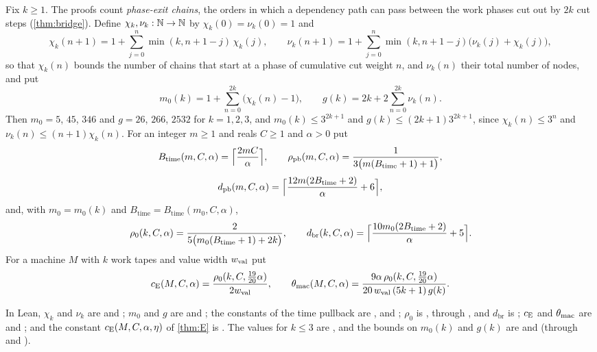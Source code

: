 Fix $k\ge1$. The proofs count \emph{phase-exit chains}, the orders in which a dependency path can pass between the work phases cut
out by $2k$ cut steps (\cref{thm:bridge}). Define $\chi_k,\nu_k:\mathbb{N}\to\mathbb{N}$ by $\chi_k(0)=\nu_k(0)=1$ and
\[
  \chi_k(n+1)=1+\sum_{j=0}^{n}\min(k,n+1-j)\,\chi_k(j),\qquad
  \nu_k(n+1)=1+\sum_{j=0}^{n}\min(k,n+1-j)\bigl(\nu_k(j)+\chi_k(j)\bigr),
\]
so that $\chi_k(n)$ bounds the number of chains that start at a phase of cumulative cut weight $n$, and $\nu_k(n)$ their total number
of nodes, and put
\[
  m_0(k)=1+\sum_{n=0}^{2k}\bigl(\chi_k(n)-1\bigr),\qquad g(k)=2k+2\sum_{n=0}^{2k}\nu_k(n).
\]
Then $m_0=5$, $45$, $346$ and $g=26$, $266$, $2532$ for $k=1,2,3$, and $m_0(k)\le3^{2k+1}$ and $g(k)\le(2k+1)3^{2k+1}$, since
$\chi_k(n)\le3^n$ and $\nu_k(n)\le(n+1)\chi_k(n)$. For an integer $m\ge1$ and reals $C\ge1$ and
$\alpha>0$ put
\[
  B_{\mathrm{time}}(m,C,\alpha)=\Bigl\lceil\frac{2mC}{\alpha}\Bigr\rceil,\qquad
  \rho_{\mathrm{pb}}(m,C,\alpha)=\frac{1}{3\bigl(m(B_{\mathrm{time}}+1)+1\bigr)},
\]
\[
  d_{\mathrm{pb}}(m,C,\alpha)=\Bigl\lceil\frac{12m(2B_{\mathrm{time}}+2)}{\alpha}+6\Bigr\rceil,
\]
and, with $m_0=m_0(k)$ and $B_{\mathrm{time}}=B_{\mathrm{time}}(m_0,C,\alpha)$,
\[
  \rho_0(k,C,\alpha)=\frac{2}{5\bigl(m_0(B_{\mathrm{time}}+1)+2k\bigr)},\qquad
  d_{\mathrm{br}}(k,C,\alpha)=\Bigl\lceil\frac{10m_0(2B_{\mathrm{time}}+2)}{\alpha}+5\Bigr\rceil.
\]
For a machine $M$ with $k$ work tapes and value width $w_{\mathrm{val}}$ put
\[
  c_{\mathrm{E}}(M,C,\alpha)=\frac{\rho_0(k,C,\tfrac{19}{20}\alpha)}{2w_{\mathrm{val}}},\qquad
  \theta_{\mathrm{mac}}(M,C,\alpha)=\frac{9\alpha\,\rho_0(k,C,\tfrac{19}{20}\alpha)}{20\,w_{\mathrm{val}}\,(5k+1)\,g(k)}.
\]
\begin{sloppypar}
In Lean, $\chi_k$ and $\nu_k$ are  and ; $m_0$ and $g$ are  and
; the constants of the time pullback are ,  and
; $\rho_0$ is , through , and $d_{\mathrm{br}}$ is
; $c_{\mathrm{E}}$ and $\theta_{\mathrm{mac}}$ are  and ; and the constant
$c_{\mathrm{E}}(M,C,\alpha,\eta)$ of \cref{thm:E} is . The values for $k\le3$ are ,
and the bounds on $m_0(k)$ and $g(k)$ are  and  (through
 and ).
\end{sloppypar}

